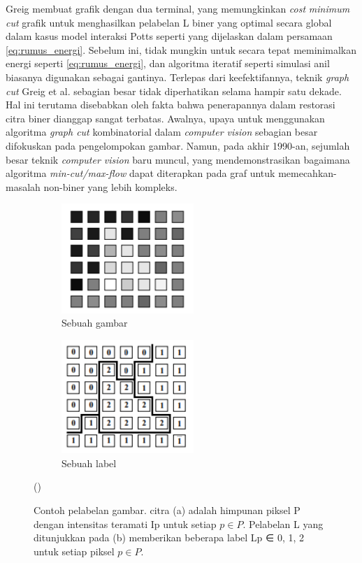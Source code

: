 Greig membuat grafik dengan dua terminal, yang memungkinkan \emph{cost} \emph{minimum cut} 
grafik untuk menghasilkan pelabelan L biner yang optimal secara global dalam kasus 
model interaksi Potts seperti yang dijelaskan dalam persamaan \ref{eq:rumus_energi}. Sebelum ini, 
tidak mungkin untuk secara tepat meminimalkan energi seperti \ref{eq:rumus_energi}, dan 
algoritma iteratif seperti simulasi anil biasanya digunakan sebagai gantinya.
Terlepas dari keefektifannya, teknik \emph{graph cut} Greig et al. sebagian besar 
tidak diperhatikan selama hampir satu dekade. Hal ini terutama disebabkan oleh 
fakta bahwa penerapannya dalam restorasi citra biner dianggap sangat terbatas. 
Awalnya, upaya untuk menggunakan algoritma \emph{graph cut} kombinatorial dalam 
\emph{computer vision} sebagian besar difokuskan pada pengelompokan gambar. Namun, 
pada akhir 1990-an, sejumlah besar teknik \emph{computer vision} baru muncul, 
yang mendemonstrasikan bagaimana algoritma \emph{min-cut/max-flow} dapat diterapkan 
pada graf untuk memecahkan-masalah non-biner yang lebih kompleks. 


\begin{figure}[H] 
\centering
  \begin{subfigure}{.5\textwidth}
    \centering{}
    \includegraphics[width=0.55\textwidth]{gambar/gambar_1-A.png}
    \caption{Sebuah gambar}
  \end{subfigure}%
  \begin{subfigure}{.5\textwidth}
    \centering{}
    \includegraphics[width=0.55\textwidth]{gambar/gambar_1-B.png}
    \caption{Sebuah label}
  \end{subfigure}  
\caption{
    Contoh pelabelan gambar. citra (a) adalah himpunan piksel P dengan intensitas teramati Ip untuk setiap \(p \in P.\) Pelabelan L yang ditunjukkan 
    pada (b) memberikan beberapa label Lp ∈ {0, 1, 2} untuk setiap piksel \(p \in P.\) 
    } (\cite{Boykov:2004})
\label{img:pelabelan_citra}
\end{figure}


